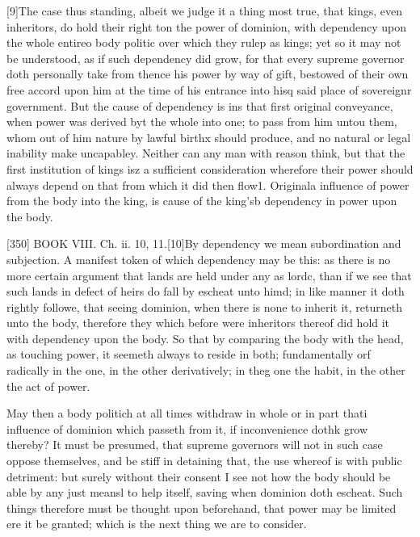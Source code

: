 [9]The case thus standing, albeit we judge it a thing most true, that kings, even inheritors, do hold their right ton the power of dominion, with dependency upon the whole entireo body politic over which they rulep as kings; yet so it may not be understood, as if such dependency did grow, for that every supreme governor doth personally take from thence his power by way of gift, bestowed of their own free accord upon him at the time of his entrance into hisq said place of sovereignr government. But the cause of dependency is ins that first original conveyance, when power was derived byt the whole into one; to pass from him untou them, whom out of him nature by lawful birthx should produce, and no natural or legal inability make uncapabley. Neither can any man with reason think, but that the first institution of kings isz a sufficient consideration wherefore their power should always depend on that from which it did then flow1. Originala influence of power from the body into the king, is cause of the king’sb dependency in power upon the body.

[350]
BOOK VIII. Ch. ii. 10, 11.[10]By dependency we mean subordination and subjection. A manifest token of which dependency may be this: as there is no more certain argument that lands are held under any as lordc, than if we see that such lands in defect of heirs do fall by escheat unto himd; in like manner it doth rightly followe, that seeing dominion, when there is none to inherit it, returneth unto the body, therefore they which before were inheritors thereof did hold it with dependency upon the body. So that by comparing the body with the head, as touching power, it seemeth always to reside in both; fundamentally orf radically in the one, in the other derivatively; in theg one the habit, in the other the act of power.

May then a body politich at all times withdraw in whole or in part thati influence of dominion which passeth from it, if inconvenience dothk grow thereby? It must be presumed, that supreme governors will not in such case oppose themselves, and be stiff in detaining that, the use whereof is with public detriment: but surely without their consent I see not how the body should be able by any just meansl to help itself, saving when dominion doth escheat. Such things therefore must be thought upon beforehand, that power may be limited ere it be granted; which is the next thing we are to consider.

